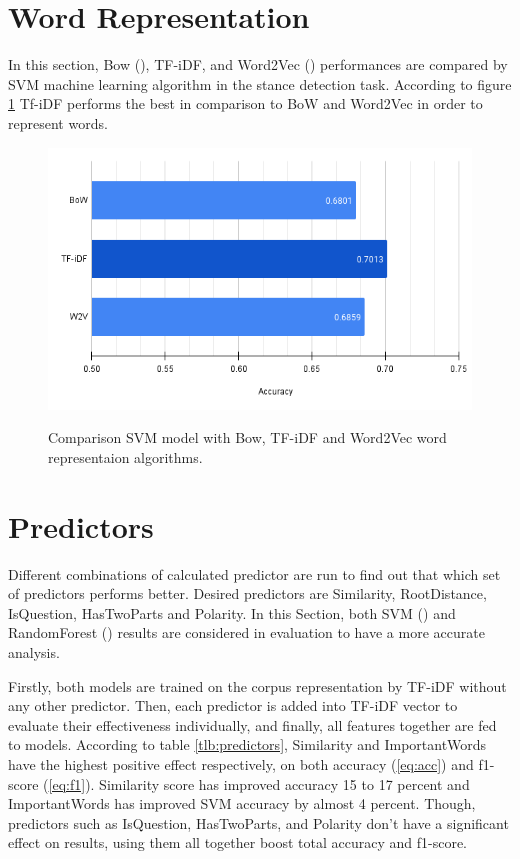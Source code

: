\section{Word Representation}
In this section, Bow (\cite{bow}), TF-iDF, and Word2Vec (\cite{word2vec}) performances are compared by SVM machine learning algorithm in the stance detection task. According to figure \ref{fig:wordrep} Tf-iDF performs the best in comparison to BoW and Word2Vec in order to represent words.
\begin{figure}%
	\centering
	{\includegraphics[width=12.5cm]{statistics/WordRep.png} }
	\caption{Comparison SVM model with Bow, TF-iDF and Word2Vec word representaion algorithms.}%
	\label{fig:wordrep}%
\end{figure}

\section{Predictors}
\label{sec:predictors}
Different combinations of calculated predictor are run to find out that which set of predictors performs better. Desired predictors are Similarity, RootDistance, IsQuestion, HasTwoParts and Polarity. In this Section, both SVM (\cite{svc}) and RandomForest (\cite{randomforest}) results are considered in evaluation to have a more accurate analysis.

Firstly, both models are trained on the corpus representation by TF-iDF without any other predictor. Then, each predictor is added into TF-iDF vector to evaluate their effectiveness individually, and finally, all features together are fed to models. According to table \ref{tlb:predictors}, Similarity and ImportantWords have the highest positive effect respectively, on both accuracy (\ref{eq:acc}) and f1-score (\ref{eq:f1}). Similarity score has improved accuracy 15 to 17 percent and ImportantWords has improved SVM accuracy by almost 4 percent. Though, predictors such as IsQuestion, HasTwoParts, and Polarity don't have a significant effect on results, using them all together boost total accuracy and f1-score. 

